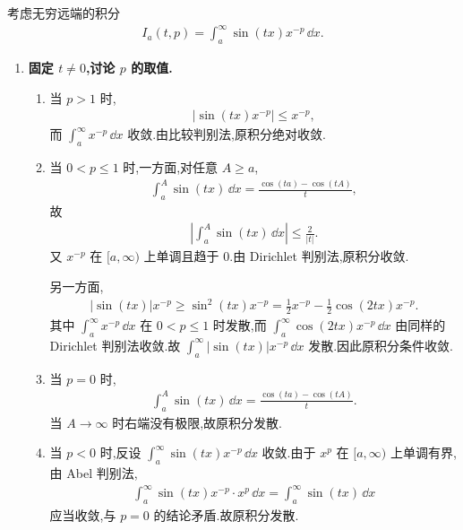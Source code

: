\begin{exbox}
	考虑无穷远端的积分
	\begin{align*}
		I_a(t,p)=\int_a^\infty \sin(tx)x^{-p}\,\dd x.
	\end{align*}

	\begin{enumerate}
		\item \textbf{固定 $t\neq0$,讨论 $p$ 的取值.}

		\begin{enumerate}
			\item 当 $p>1$ 时,
			\begin{align*}
				|\sin(tx)x^{-p}|\leq x^{-p},
			\end{align*}
			而 $\int_a^\infty x^{-p}\,\dd x$ 收敛.由比较判别法,原积分绝对收敛.

			\item 当 $0<p\leq1$ 时,一方面,对任意 $A\geq a$,
			\begin{align*}
				\int_a^A \sin(tx)\,\dd x
				=
				\frac{\cos(ta)-\cos(tA)}{t},
			\end{align*}
			故
			\begin{align*}
				\left|\int_a^A \sin(tx)\,\dd x\right|
				\leq \frac{2}{|t|}.
			\end{align*}
			又 $x^{-p}$ 在 $[a,\infty)$ 上单调且趋于 $0$.由 Dirichlet 判别法,原积分收敛.

			另一方面,
			\begin{align*}
				|\sin(tx)|x^{-p}
				\geq \sin^2(tx)x^{-p}
				=\frac12x^{-p}-\frac12\cos(2tx)x^{-p}.
			\end{align*}
			其中 $\int_a^\infty x^{-p}\,\dd x$ 在 $0<p\leq1$ 时发散,而 $\int_a^\infty \cos(2tx)x^{-p}\,\dd x$ 由同样的 Dirichlet 判别法收敛.故 $\int_a^\infty |\sin(tx)|x^{-p}\,\dd x$ 发散.因此原积分条件收敛.

			\item 当 $p=0$ 时,
			\begin{align*}
				\int_a^A \sin(tx)\,\dd x
				=
				\frac{\cos(ta)-\cos(tA)}{t}.
			\end{align*}
			当 $A\to\infty$ 时右端没有极限,故原积分发散.

			\item 当 $p<0$ 时,反设 $\int_a^\infty \sin(tx)x^{-p}\,\dd x$ 收敛.由于 $x^p$ 在 $[a,\infty)$ 上单调有界,由 Abel 判别法,
			\begin{align*}
				\int_a^\infty \sin(tx)x^{-p}\cdot x^p\,\dd x
				=
				\int_a^\infty \sin(tx)\,\dd x
			\end{align*}
			应当收敛,与 $p=0$ 的结论矛盾.故原积分发散.
		\end{enumerate}


\end{enumerate}
\end{exbox}

